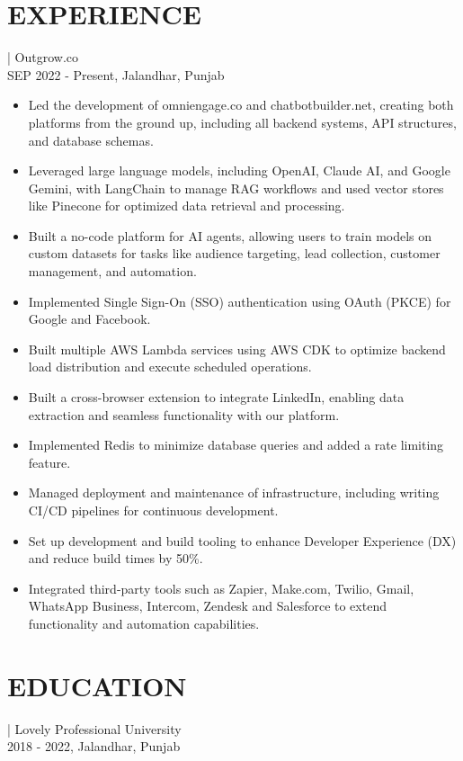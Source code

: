 \documentclass[]{resume}
\begin{document}
\section{EXPERIENCE}
 | \textrm{Outgrow.co}\\
SEP 2022 - Present, Jalandhar, Punjab
\begin{itemize}
  \item Led the development of omniengage.co and chatbotbuilder.net, creating both platforms from the ground up, including all backend systems, API structures, and database schemas.
  \item Leveraged large language models, including OpenAI, Claude AI, and Google Gemini, with LangChain to manage RAG workflows and used vector stores like Pinecone for optimized data retrieval and processing.
  \item Built a no-code platform for AI agents, allowing users to train models on custom datasets for tasks like audience targeting, lead collection, customer management, and automation.
  \item Implemented Single Sign-On (SSO) authentication using OAuth (PKCE) for Google and Facebook.
  \item Built multiple AWS Lambda services using AWS CDK to optimize backend load distribution and execute scheduled operations.
  \item Built a cross-browser extension to integrate LinkedIn, enabling data extraction and seamless functionality with our platform.
  \item Implemented Redis to minimize database queries and added a rate limiting feature.
  \item Managed deployment and maintenance of infrastructure, including writing CI/CD pipelines for continuous development.
  \item Set up development and build tooling to enhance Developer Experience (DX) and reduce build times by 50\%.
  \item Integrated third-party tools such as Zapier, Make.com, Twilio, Gmail, WhatsApp Business, Intercom, Zendesk and Salesforce to extend functionality and automation capabilities.
\end{itemize}

\section{EDUCATION}
 | \textrm{Lovely Professional University}\\
2018 - 2022, Jalandhar, Punjab
\end{document}
